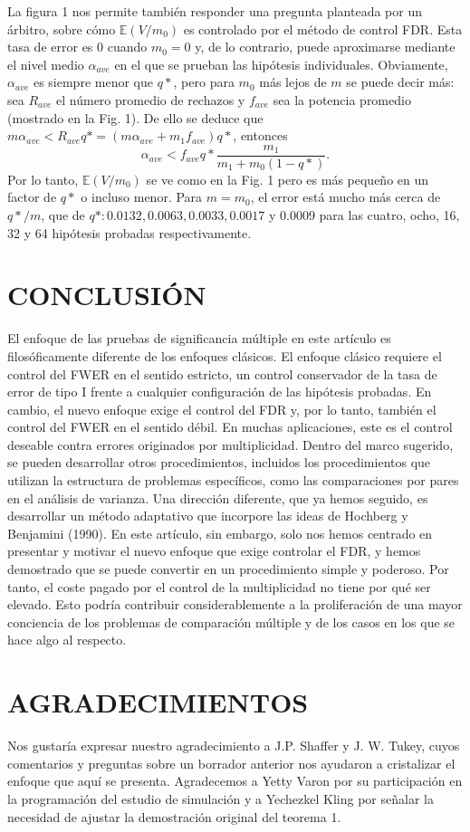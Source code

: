 \documentclass[11pt,letterpaper]{article}
\newcommand{\mE}{\mathbb{E}}
\begin{document}
La figura 1 nos permite también responder una pregunta planteada por un árbitro, sobre cómo $\mE (V / m_0)$ es controlado por el método de control FDR. Esta tasa de error es 0 cuando $m_0 = 0$ y, de lo contrario, puede aproximarse mediante el nivel medio $\alpha_{ave}$ en el que se prueban las hipótesis individuales. Obviamente, $\alpha_{ave}$ es siempre menor que $q*$, pero para $m_0$ más lejos de $m$ se puede decir más: sea $R_{ave}$ el número promedio de rechazos y $f_{ave}$ sea la potencia promedio (mostrado en la Fig. 1). De ello se deduce que $m\alpha_{ave} <R_{ave} q * = (m\alpha_{ave} + m_1 f_{ave}) q *$, entonces
$$\alpha_{ave}<f_{ave}q*\frac{m_1}{m_1+m_0(1-q*)}.$$
Por lo tanto, $\mE (V / m_0)$ se ve como en la Fig. 1 pero es más pequeño en un factor de $q*$ o incluso menor. Para $m = m_0$, el error está mucho más cerca de $q* / m$, que de $q*: 0.0132, 0.0063, 0.0033, 0.0017$ y 0.0009 para las cuatro, ocho, 16, 32 y 64 hipótesis probadas respectivamente.

\section{CONCLUSIÓN}
El enfoque de las pruebas de significancia múltiple en este artículo es filosóficamente diferente de los enfoques clásicos. El enfoque clásico requiere el control del FWER en el sentido estricto, un control conservador de la tasa de error de tipo I frente a cualquier configuración de las hipótesis probadas. En cambio, el nuevo enfoque exige el control del FDR y, por lo tanto, también el control del FWER en el sentido débil. En muchas aplicaciones, este es el control deseable contra errores originados por multiplicidad.
Dentro del marco sugerido, se pueden desarrollar otros procedimientos, incluidos los procedimientos que utilizan la estructura de problemas específicos, como las comparaciones por pares en el análisis de varianza. Una dirección diferente, que ya hemos seguido, es desarrollar un método adaptativo que incorpore las ideas de Hochberg y Benjamini (1990). En este artículo, sin embargo, solo nos hemos centrado en presentar y motivar el nuevo enfoque que exige controlar el FDR, y hemos demostrado que se puede convertir en un procedimiento simple y poderoso. Por tanto, el coste pagado por el control de la multiplicidad no tiene por qué ser elevado. Esto podría contribuir considerablemente a la proliferación de una mayor conciencia de los problemas de comparación múltiple y de los casos en los que se hace algo al respecto.

\section{AGRADECIMIENTOS}
Nos gustaría expresar nuestro agradecimiento a J.P. Shaffer y J. W. Tukey, cuyos comentarios y preguntas sobre un borrador anterior nos ayudaron a cristalizar el enfoque que aquí se presenta. Agradecemos a Yetty Varon por su participación en la programación del estudio de simulación y a Yechezkel Kling por señalar la necesidad de ajustar la demostración original del teorema 1.
\end{document}
